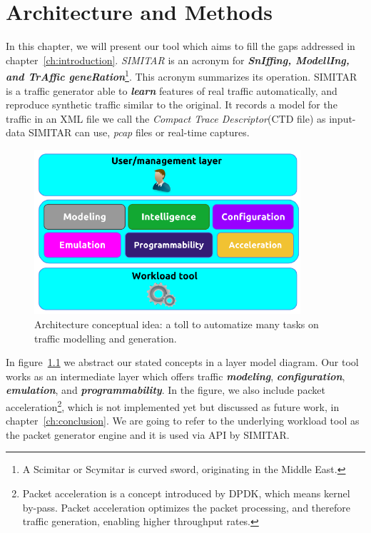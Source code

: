 \chapter{Architecture and Methods}\label{ch:architecture}

In this chapter, we will present our tool which aims to fill the gaps addressed in chapter~\ref{ch:introduction}. \textit{SIMITAR} is an acronym for \textbf{\textit{SnIffing, ModellIng, and TrAffic geneRation}}\footnote{A Scimitar or Scymitar is curved sword, originating in the Middle East\cite{scymitar-sword}.}. This acronym summarizes its operation.
SIMITAR is a traffic generator able to \textbf{\textit{learn}} features of real traffic automatically, and reproduce synthetic traffic similar to the original. It records a model for the traffic in an XML file we call the \textit{Compact Trace Descriptor}(CTD file) as input-data SIMITAR can use, \textit{pcap} files or real-time captures. 

\begin{figure}[ht!]
    \centering
    \includegraphics[height=2.4in]{figures/ch1/layer-diagram}
    \caption{ Architecture conceptual idea: a toll to automatize many tasks on traffic modelling and generation.}
    \label{fig:layer-diagram}
\end{figure}

In figure~\ref{fig:layer-diagram} we abstract our stated concepts in a layer model diagram. Our tool works as an intermediate layer which offers traffic \textbf{\textit{modeling}}, \textbf{\textit{configuration}}, \textbf{\textit{emulation}}, and \textbf{\textit{programmability}}. In the figure, we also include packet acceleration\footnote{Packet acceleration is a concept introduced by DPDK\cite{web-dpdk}, which means kernel by-pass. Packet acceleration optimizes the packet processing, and therefore traffic generation, enabling higher throughput rates.}, which is not implemented yet but discussed as future work, in chapter~\ref{ch:conclusion}.  We are going to refer to the underlying workload tool as the packet generator engine and it is used via API by SIMITAR. 

